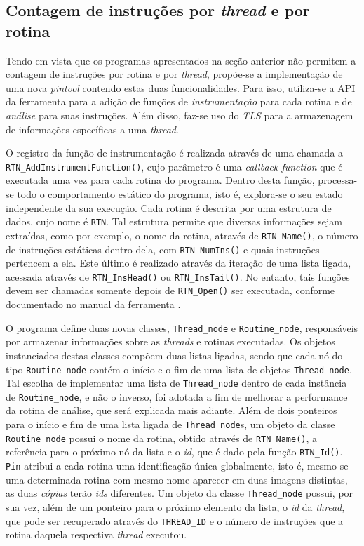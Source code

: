\documentclass[12pt]{article}
\begin{document}
\subsection{Contagem de instruções por \textit{thread} e por rotina}

Tendo em vista que os programas apresentados na seção anterior não permitem a
contagem de instruções por rotina e por \textit{thread}, propõe-se a
implementação de uma nova \textit{pintool} contendo estas duas funcionalidades.
Para isso, utiliza-se a API da ferramenta para a adição de funções de
\textit{instrumentação} para cada rotina e de \textit{análise} para suas
instruções. Além disso, faz-se uso do \textit{TLS} para a armazenagem de
informações específicas a uma \textit{thread}.

O registro da função de instrumentação é realizada através de uma chamada a
\texttt{RTN\_AddInstrumentFunction()}, cujo  parâmetro é uma
\textit{callback function} que é executada uma vez para cada rotina do
programa. Dentro desta função, processa-se todo o comportamento estático do
programa, isto é, explora-se o seu estado independente da sua execução. Cada
rotina é descrita por uma estrutura de dados, cujo nome é \texttt{RTN}. Tal
estrutura permite que diversas informações sejam extraídas, como por exemplo, o
nome da rotina, através de \texttt{RTN\_Name()}, o número de instruções
estáticas dentro dela, com \texttt{RTN\_NumIns()} e quais instruções pertencem a
ela. Este último é realizado através da iteração de uma lista ligada, acessada
através de \texttt{RTN\_InsHead()} ou \texttt{RTN\_InsTail()}. No entanto, tais
funções devem ser chamadas somente depois de \texttt{RTN\_Open()} ser executada,
conforme documentado no manual da ferramenta  \cite{Intel:12}.

O programa define duas novas classes, \texttt{Thread\_node} e
\texttt{Routine\_node}, responsáveis por armazenar informações sobre as
\textit{threads} e rotinas executadas. Os objetos instanciados destas classes
compõem duas listas ligadas, sendo que cada nó do tipo \texttt{Routine\_node}
contém o início e o fim de uma lista de objetos \texttt{Thread\_node}. Tal
escolha de implementar uma lista de \texttt{Thread\_node} dentro de cada
instância de \texttt{Routine\_node}, e não o inverso, foi adotada a fim de
melhorar a performance da rotina de análise, que será explicada mais adiante.
Além de dois ponteiros para o início e fim de uma lista ligada de
\texttt{Thread\_node}s, um objeto da classe \texttt{Routine\_node} possui o nome
da rotina, obtido através de \texttt{RTN\_Name()}, a referência para o próximo
nó da lista e o \textit{id}, que é dado pela função \texttt{RTN\_Id()}.
\texttt{Pin} atribui a cada rotina uma identificação única globalmente, isto é, 
mesmo se uma determinada rotina com mesmo nome aparecer em duas imagens distintas,
as duas \textit{cópias} terão \textit{ids} diferentes. Um objeto da classe
\texttt{Thread\_node} possui, por sua vez, além de um ponteiro para o próximo
elemento da lista, o \textit{id} da \textit{thread}, que pode ser recuperado
através do \texttt{THREAD\_ID} e o número de instruções que a rotina daquela
respectiva \textit{thread} executou.
\end{document}
